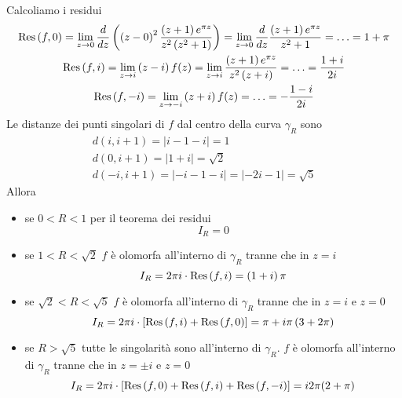 Calcoliamo i residui
\begin{gather*}
\operatorname{Res} \left(f, 0\right) = \lim_{z\rightarrow 0}\frac{d}{dz}\left(\left(z - 0\right)^{2}\frac{\left(z + 1\right) e^{\pi z}}{z^{2}\left(z^{2} + 1\right)}\right) = \lim_{z\rightarrow 0}\frac{d}{dz}\frac{\left(z + 1\right) e^{\pi z}}{z^{2} + 1} = \dotsc = 1 + \pi \\
\operatorname{Res} \left(f, i\right) = \lim_{z\rightarrow i}\left(z - i\right) f(z) = \lim_{z\rightarrow i}\frac{\left(z + 1\right) e^{\pi z}}{z^{2}\left(z + i\right)} = \dotsc = \frac{1 + i}{2i}\\
\operatorname{Res} \left(f, - i\right) = \lim_{z\rightarrow - i}\left(z + i\right) f(z) = \dotsc = - \frac{1 - i}{2i}
\end{gather*}
Le distanze dei punti singolari di $f$ dal centro della curva $\gamma_{R}$ sono
\begin{gather*}
d\left(i, i + 1\right) = \left| i - 1 - i\right| = 1\\
d\left(0, i + 1\right) = \left| 1 + i\right| = \sqrt{2}\\
d\left(- i, i + 1\right) = \left| - i - 1 - i\right| = \left| - 2i - 1\right| = \sqrt{5}
\end{gather*}
Allora
\begin{itemize}
\item se $0 < R < 1$ per il teorema dei residui
\begin{equation*}
I_{R} = 0
\end{equation*}
\item se $1 < R < \sqrt{2}$ $f$ è olomorfa all'interno di $\gamma_{R}$ tranne che in $z = i$
\begin{equation*}
I_{R} = 2\pi i \cdot \operatorname{Res} \left(f, i\right) = \left(1 + i\right) \pi
\end{equation*}
\item se $\sqrt{2} < R < \sqrt{5}$ $f$ è olomorfa all'interno di $\gamma_{R}$ tranne che in $z = i$ e $z = 0$
\begin{equation*}
I_{R} = 2\pi i \cdot \left[\operatorname{Res} \left(f, i\right) + \operatorname{Res} \left(f, 0\right)\right] = \pi + i\pi \left(3 + 2\pi\right)
\end{equation*}
\item se $R > \sqrt{5}$ tutte le singolarità sono all'interno di $\gamma_{R}$. $f$ è olomorfa all'interno di $\gamma_{R}$ tranne che in $z = \pm i$ e $z = 0$
\begin{equation*}
I_{R} = 2\pi i \cdot \left[\operatorname{Res} \left(f, 0\right) + \operatorname{Res} \left(f, i\right) + \operatorname{Res} \left(f, - i\right)\right] = i2\pi (2 + \pi)
\end{equation*}
\end{itemize}


